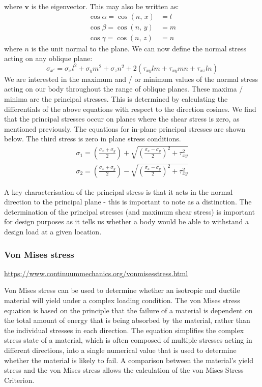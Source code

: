 where $\boldsymbol{v}$ is the eigenvector. This may also be written as:
\begin{align}
    \cos \alpha = \cos\left(n, \, x\right) & = l \\
    \cos \beta = \cos\left(n, \, y\right)  & = m \\
    \cos \gamma = \cos\left(n, \, z\right) & = n
\end{align}
where $n$ is the unit normal to the plane. We can now define the normal stress acting on any oblique plane:
\begin{equation}
    \sigma_{x'} = \sigma_xl^2 + \sigma_y m^2 +\sigma_zn^2 + 2\left(\tau_{xy}lm + \tau_{xy}mn + \tau_{xz}ln\right)
\end{equation}
We are interested in the maximum and / or minimum values of the normal stress acting on our body throughout the range of oblique planes. These maxima / minima are the principal stresses. This is determined by calculating the differentials of the above equations with respect to the direction cosines. We find that the principal stresses occur on planes where the shear stress is zero, as mentioned previously. The equations for in-plane principal stresses are shown below. The third stress is zero in plane stress conditions.
\begin{gather}
    \sigma_1 = \left(\frac{\sigma_x + \sigma_y}{2}\right)+ \sqrt{\left(\frac{\sigma_x - \sigma_y}{2} \right)^2+ \tau^2_{xy} }\\
    \sigma_2 = \left(\frac{\sigma_x + \sigma_y}{2}\right)- \sqrt{\left(\frac{\sigma_x - \sigma_y}{2} \right)^2+ \tau^2_{xy} }
\end{gather}

A key characterisation of the principal stress is that it acts in the normal direction to the principal plane - this is important to note as a distinction. The determination of the principal stresses (and maximum shear stress) is important for design purposes as it tells us whether a body would be able to withstand a design load at a given location.
\subsubsection{Von Mises stress}
\url{https://www.continuummechanics.org/vonmisesstress.html}

Von Mises stress can be used to determine whether an isotropic and ductile material will yield under a complex loading condition. The von Mises stress equation is based on the principle that the failure of a material is dependent on the total amount of energy that is being absorbed by the material, rather than the individual stresses in each direction. The equation simplifies the complex stress state of a material, which is often composed of multiple stresses acting in different directions, into a single numerical value that is used to determine whether the material is likely to fail. A comparison between the material's yield stress and the von Mises stress allows the calculation of the von Mises Stress Criterion.

